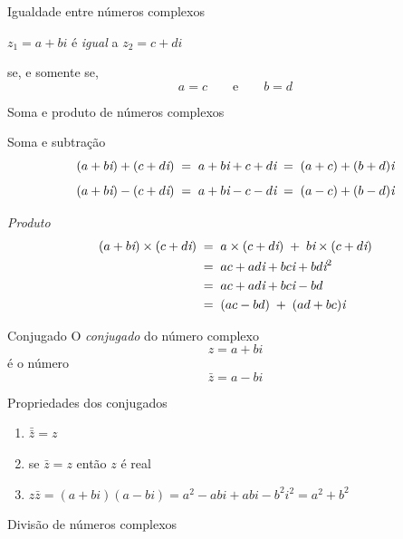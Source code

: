 Igualdade entre números complexos

\(z_1=a+bi\) \; é \emph{igual} a \; \(z_2=c+di\)

se, e somente se,
\[
   a = c
   \qquad\text{e}\qquad
   b = d
\]

Soma e produto de números complexos

Soma e subtração
\[
  (a+b\emph{i}) + (c+d\emph{i})
  \;=\;  a + b\emph{i} + c + d\emph{i}
  \;=\; (a+c) + (b+d) \emph{i}
\]
\vspace{-\baselineskip}
\[
  (a+b\emph{i}) - (c+d\emph{i})
  \;=\; a+b\emph{i} -c -d\emph{i}
  \;=\; (a-c) + (b-d) \emph{i}
\]

\emph{Produto}
\begin{align*}
    (a+b\emph{i}) \times (c+d\emph{i})
    & \;=\; a         \times (c+d\emph{i})
      \;+\; b\emph{i} \times (c+d\emph{i})  \\
    & \;=\; ac + ad\emph{i} + bc\emph{i} + bd\emph{i}^2  \\
    & \;=\; ac + ad\emph{i} + bc\emph{i} - bd  \\
    & \;=\; (ac-bd) \;+\; (ad+bc) \emph{i}
\end{align*}

Conjugado
O \emph{conjugado} do número complexo
\[
  z = a + bi
\]
é o número
\[
  \bar{z} = a - bi
\]

Propriedades dos conjugados
\begin{enumerate}
  \item \;
  \(
    \bar{\bar{z}} = z
  \)

  \item \; se \(\bar{z}=z\) então $z$ é real

  \item \;
  \(
    z\bar{z}
    = (a+bi)(a-bi)
    = a^2 -abi +abi - b^2 i^2
    = a^2 + b^2
  \)
\end{enumerate}

Divisão de números complexos

